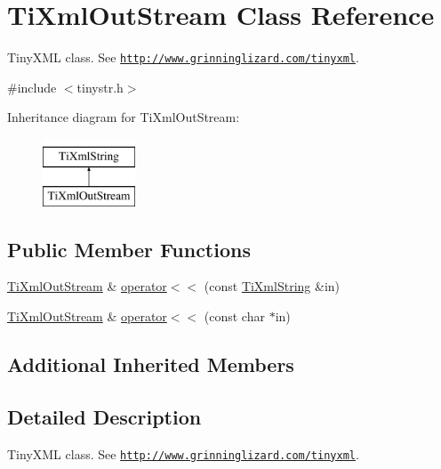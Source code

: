 \hypertarget{class_ti_xml_out_stream}{}\section{Ti\+Xml\+Out\+Stream Class Reference}
\label{class_ti_xml_out_stream}


Tiny\+X\+ML class. See \href{http://www.grinninglizard.com/tinyxml}{\tt http\+://www.\+grinninglizard.\+com/tinyxml}.  




{\ttfamily \#include $<$tinystr.\+h$>$}

Inheritance diagram for Ti\+Xml\+Out\+Stream\+:\begin{figure}[H]
\begin{center}
\leavevmode
\includegraphics[height=2.000000cm]{class_ti_xml_out_stream}
\end{center}
\end{figure}
\subsection*{Public Member Functions}
\begin{DoxyCompactItemize}
\item 
\hyperlink{class_ti_xml_out_stream}{Ti\+Xml\+Out\+Stream} \& \hyperlink{class_ti_xml_out_stream_a3640dcb1c0903be3bc6966cdc9a79db6}{operator$<$$<$} (const \hyperlink{class_ti_xml_string}{Ti\+Xml\+String} \&in)
\item 
\hyperlink{class_ti_xml_out_stream}{Ti\+Xml\+Out\+Stream} \& \hyperlink{class_ti_xml_out_stream_af2117e5a8cbfcb69544804ad2859bfb6}{operator$<$$<$} (const char $\ast$in)
\end{DoxyCompactItemize}
\subsection*{Additional Inherited Members}


\subsection{Detailed Description}
Tiny\+X\+ML class. See \href{http://www.grinninglizard.com/tinyxml}{\tt http\+://www.\+grinninglizard.\+com/tinyxml}. 

